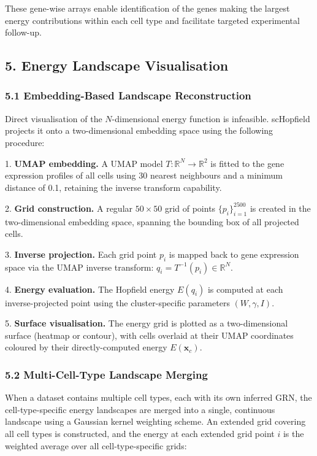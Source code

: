 \documentclass[11pt]{article}
\begin{document}
These gene-wise arrays enable identification of the genes making the largest energy contributions within each cell type and facilitate targeted experimental follow-up.



\subsection*{5. Energy Landscape Visualisation}


\subsubsection*{5.1 Embedding-Based Landscape Reconstruction}

Direct visualisation of the $N$-dimensional energy function is infeasible. scHopfield projects it onto a two-dimensional embedding space using the following procedure:

1. \textbf{UMAP embedding.} A UMAP model $T: \mathbb{R}^N \to \mathbb{R}^2$ is fitted to the gene expression profiles of all cells using 30 nearest neighbours and a minimum distance of 0.1, retaining the inverse transform capability.

2. \textbf{Grid construction.} A regular $50 \times 50$ grid of points $\{p_i\}_{i=1}^{2500}$ is created in the two-dimensional embedding space, spanning the bounding box of all projected cells.

3. \textbf{Inverse projection.} Each grid point $p_i$ is mapped back to gene expression space via the UMAP inverse transform: $q_i = T^{-1}(p_i) \in \mathbb{R}^N$.

4. \textbf{Energy evaluation.} The Hopfield energy $E(q_i)$ is computed at each inverse-projected point using the cluster-specific parameters $(W, \gamma, I)$.

5. \textbf{Surface visualisation.} The energy grid is plotted as a two-dimensional surface (heatmap or contour), with cells overlaid at their UMAP coordinates coloured by their directly-computed energy $E(\mathbf{x}_c)$.


\subsubsection*{5.2 Multi-Cell-Type Landscape Merging}

When a dataset contains multiple cell types, each with its own inferred GRN, the cell-type-specific energy landscapes are merged into a single, continuous landscape using a Gaussian kernel weighting scheme. An extended grid covering all cell types is constructed, and the energy at each extended grid point $i$ is the weighted average over all cell-type-specific grids:
\end{document}
